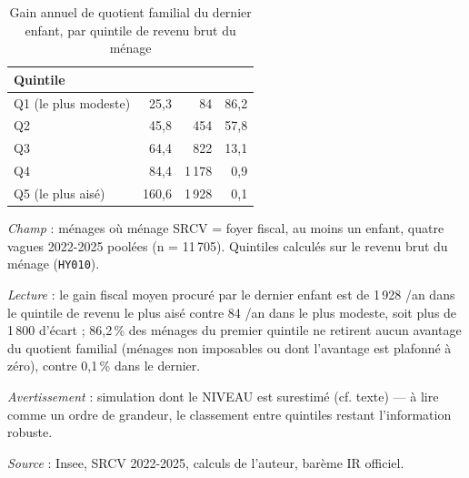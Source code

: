 \documentclass[12pt,a4paper]{article}
\begin{document}
\bigskip

\begin{table}[htbp]
	\centering
	\footnotesize
	\setlength{\tabcolsep}{6pt}
	\begin{threeparttable}
		\caption{Gain annuel de quotient familial du dernier enfant, par quintile de revenu brut du ménage}
		\label{tab:qf}
		\begin{tabular}{lrrr}
			\toprule
			Quintile & 
			& 
			&  \\
			\midrule
			Q1 (le plus modeste) & 25,3  & 84    & 86,2 \\
			Q2                   & 45,8  & 454   & 57,8 \\
			Q3                   & 64,4  & 822   & 13,1 \\
			Q4                   & 84,4  & 1\,178 & 0,9 \\
			Q5 (le plus aisé)    & 160,6 & 1\,928 & 0,1 \\
			\bottomrule
		\end{tabular}
		\begin{tablenotes}[flushleft]\scriptsize
			\item \textit{Champ} : ménages où ménage SRCV = foyer fiscal, au moins un enfant, quatre
			vagues 2022-2025 poolées (n = 11\,705). Quintiles calculés sur le revenu brut du ménage
			(\texttt{HY010}).
			\item \textit{Lecture} : le gain fiscal moyen procuré par le dernier enfant est de
			1\,928 \texteuro/an dans le quintile de revenu le plus aisé contre 84 \texteuro/an dans le
			plus modeste, soit plus de 1\,800 \texteuro{} d'écart ; 86,2\,\% des ménages du premier
			quintile ne retirent aucun avantage du quotient familial (ménages non imposables ou dont
			l'avantage est plafonné à zéro), contre 0,1\,\% dans le dernier.
			\item \textit{Avertissement} : simulation dont le NIVEAU est surestimé (cf. texte) — à lire
			comme un ordre de grandeur, le classement entre quintiles restant l'information robuste.
			\item \textit{Source} : Insee, SRCV 2022-2025, calculs de l'auteur, barème IR officiel.
		\end{tablenotes}
	\end{threeparttable}
\end{table}
\end{document}
